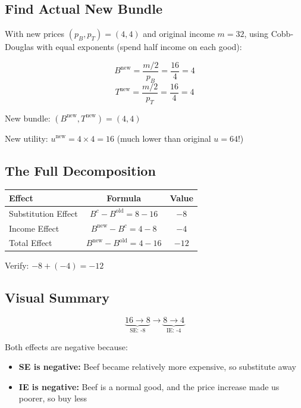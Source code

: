 \documentclass[11pt]{article}
\begin{document}
\subsection{Find Actual New Bundle}

With new prices $(p_B, p_T) = (4, 4)$ and original income $m = 32$, using Cobb-Douglas with equal exponents (spend half income on each good):

$$B^{\text{new}} = \frac{m/2}{p_B} = \frac{16}{4} = 4$$
$$T^{\text{new}} = \frac{m/2}{p_T} = \frac{16}{4} = 4$$

New bundle: $(B^{\text{new}}, T^{\text{new}}) = (4, 4)$

New utility: $u^{\text{new}} = 4 \times 4 = 16$ (much lower than original $u = 64$!)

\subsection{The Full Decomposition}

\begin{center}
\begin{tabular}{|l|c|c|}
\hline
\textbf{Effect} & \textbf{Formula} & \textbf{Value} \\
\hline
Substitution Effect & $B^c - B^{\text{old}} = 8 - 16$ & $-8$ \\
Income Effect & $B^{\text{new}} - B^c = 4 - 8$ & $-4$ \\
\hline
Total Effect & $B^{\text{new}} - B^{\text{old}} = 4 - 16$ & $-12$ \\
\hline
\end{tabular}
\end{center}

Verify: $-8 + (-4) = -12$ \checkmark

\subsection{Visual Summary}

$$\underbrace{16 \to 8}_{\text{SE: -8}} \to \underbrace{8 \to 4}_{\text{IE: -4}}$$

Both effects are negative because:
\begin{itemize}
    \item \textbf{SE is negative:} Beef became relatively more expensive, so substitute away
    \item \textbf{IE is negative:} Beef is a normal good, and the price increase made us poorer, so buy less
\end{itemize}
\end{document}
